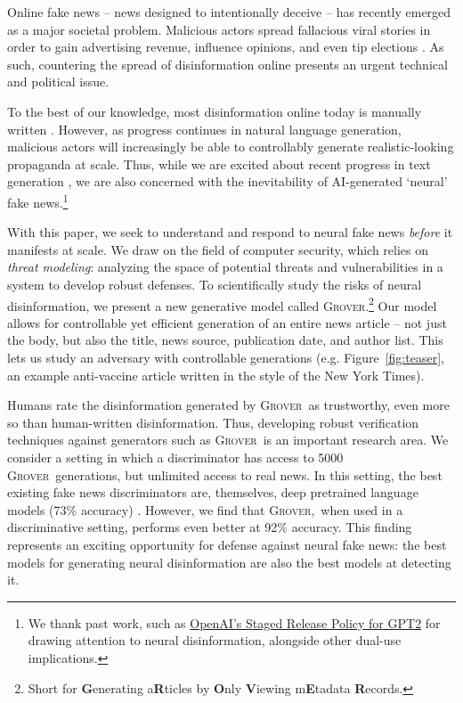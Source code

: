\documentclass{article}
\newcommand{\modelname}{{\textsc{Grover}}}
\newcommand{\modelnamelong}{{\textbf{G}enerating a\textbf{R}ticles by \textbf{O}nly \textbf{V}iewing m\textbf{E}tadata \textbf{R}ecords}}
\begin{document}
Online fake news -- news designed to intentionally deceive -- has recently emerged as a major societal problem. Malicious actors spread fallacious viral stories in order to gain advertising revenue, influence opinions, and even tip elections \citep{faris2017partisanship, wardle2017information}. As such, countering the spread of disinformation online presents an urgent technical and political issue.

To the best of our knowledge, most disinformation online today is manually written \citep{vargo2018agenda}. However, as progress continues in natural language generation, malicious actors will increasingly be able to controllably generate realistic-looking propaganda at scale. Thus, while we are excited about recent progress in text generation \citep{Jzefowicz2016ExploringTL,radford2018improving,radford2019gpttwo}, we are also concerned with the inevitability of AI-generated `neural' fake news.\footnote{
We thank past work, such as \href{https://openai.com/blog/better-language-models/}{OpenAI's Staged Release Policy for GPT2} for drawing attention to neural disinformation, alongside other dual-use implications.
}

With this paper, we seek to understand and respond to neural fake news \emph{before} it manifests at scale. We draw on the field of computer security, which relies on \emph{threat modeling}: analyzing the space of potential threats and vulnerabilities in a system to develop robust defenses. To scientifically study the risks of neural disinformation, we present a new generative model called \modelname.\footnote{Short for \modelnamelong.} Our model allows for controllable yet efficient generation of an entire news article -- not just the body, but also the title, news source, publication date, and author list. This lets us study an adversary with controllable generations 
(e.g. Figure~\ref{fig:teaser}, an example anti-vaccine article written in the style of the New York Times).

Humans rate the disinformation generated by \modelname~as trustworthy, even more so than human-written disinformation. Thus, developing robust verification techniques against generators such as \modelname~is an important research area.
We consider a setting in which a discriminator has access to 5000 \modelname~generations, but unlimited access to real news. In this setting, the best existing fake news discriminators 
are, themselves, deep pretrained language models (73\% accuracy) \citep{peters2018deep,radford2018improving,radford2019gpttwo,devlin2018bert}. However, we find that \modelname,~when used in a discriminative setting, performs even better at 92\% accuracy. This finding represents an exciting opportunity for defense against neural fake news: the best models for generating neural disinformation are also the best models at detecting it. 
\end{document}
